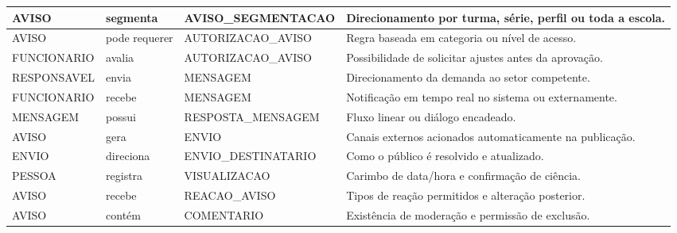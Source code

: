 \begin{table}[!ht]
\begin{tabularx}{\linewidth}{|>{\raggedright\arraybackslash}p{2.9cm}|>{\centering\arraybackslash}p{1.4cm}|>{\raggedright\arraybackslash}p{2.8cm}|>{\raggedright\arraybackslash}X|}
\hline AVISO & segmenta & AVISO\_SEGMENTACAO & Direcionamento por turma, série, perfil ou toda a escola. \\
\hline AVISO & pode requerer & AUTORIZACAO\_AVISO & Regra baseada em categoria ou nível de acesso. \\
\hline FUNCIONARIO & avalia & AUTORIZACAO\_AVISO & Possibilidade de solicitar ajustes antes da aprovação. \\
\hline RESPONSAVEL & envia & MENSAGEM & Direcionamento da demanda ao setor competente. \\
\hline FUNCIONARIO & recebe & MENSAGEM & Notificação em tempo real no sistema ou externamente. \\
\hline MENSAGEM & possui & RESPOSTA\_MENSAGEM & Fluxo linear ou diálogo encadeado. \\
\hline AVISO & gera & ENVIO & Canais externos acionados automaticamente na publicação. \\
\hline ENVIO & direciona & ENVIO\_DESTINATARIO & Como o público é resolvido e atualizado. \\
\hline PESSOA & registra & VISUALIZACAO & Carimbo de data/hora e confirmação de ciência. \\
\hline AVISO & recebe & REACAO\_AVISO & Tipos de reação permitidos e alteração posterior. \\
\hline AVISO & contém & COMENTARIO & Existência de moderação e permissão de exclusão. \\
\hline\end{tabularx}
\end{table}
